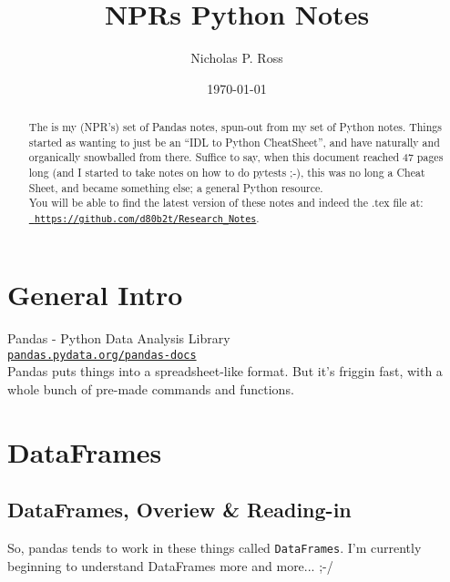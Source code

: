 \documentclass[11pt,a4paper]{article}
\begin{document}
\title{NPRs Python Notes}
\author{Nicholas P. Ross}
\date{\today}
\maketitle




\begin{abstract}
The is my (NPR's) set of Pandas notes, spun-out from my set of Python
notes.  Things started as wanting to just be an ``IDL to Python
CheatSheet'', and have naturally and organically snowballed from
there.
Suffice to say, when this document reached 47 pages long (and I
started to take notes on how to do pytests ;-), this was no long a
Cheat Sheet, and became something else; a general Python resource. \\

You will be able to find the latest version of these notes
and indeed the .tex file at:\\
\href{https://github.com/d80b2t/Research\_Notes}{\tt
https://github.com/d80b2t/Research\_Notes}.
\end{abstract}


\newpage
\tableofcontents




\newpage
\section{General Intro}
\noindent
Pandas - Python Data Analysis Library\\
\href{http://pandas.pydata.org/pandas-docs/}{{\tt pandas.pydata.org/pandas-docs}}\\

\noindent 
Pandas puts things into a spreadsheet-like format.  But it's friggin
fast, with a whole bunch of pre-made commands and functions.



\newpage
\section{DataFrames}

\subsection{DataFrames, Overiew \& Reading-in}
\smallskip
\smallskip
\noindent 
So, pandas tends to work in these things called {\tt DataFrames}. 
I'm currently beginning to understand DataFrames more and more... ;-/
\end{document}
